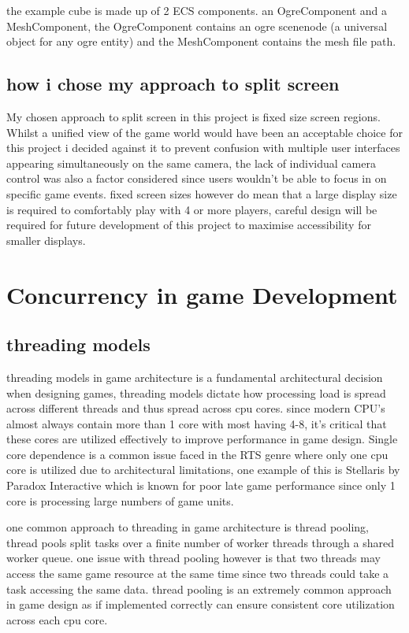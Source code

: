 \documentclass[]{final_report}
\begin{document}
the example cube is made up of 2 ECS components. an OgreComponent and a MeshComponent, the OgreComponent contains an ogre scenenode (a universal object for any ogre entity) and the MeshComponent contains the mesh file path.
\subsection{how i chose my approach to split screen}
My chosen approach to split screen in this project is fixed size screen regions. Whilst a unified view of the game world would have been an acceptable choice for this project i decided against it to prevent confusion with multiple user interfaces appearing simultaneously on the same camera, the lack of individual camera control was also a factor considered since users wouldn't be able to focus in on specific game events. fixed screen sizes however do mean that a large display size is required to comfortably play with 4 or more players, careful design will be required for future development of this project to maximise accessibility for smaller displays.

\section{Concurrency in game Development}
\subsection{threading models}
threading models in game architecture is a fundamental architectural decision when designing games, threading models dictate how processing load is spread across different threads and thus spread across cpu cores. since modern CPU's almost always contain more than 1 core with most having 4-8, it's critical that these cores are utilized effectively to improve performance in game design. Single core dependence is a common issue faced in the RTS genre where only one cpu core is utilized due to architectural limitations, one example of this is Stellaris by Paradox Interactive which is known for poor late game performance since only 1 core is processing large numbers of game units.

one common approach to threading in game architecture is thread pooling, thread pools split tasks over a finite number of worker threads through a shared worker queue. one issue with thread pooling however is that two threads may access the same game resource at the same time since two threads could take a task accessing the same data. thread pooling is an extremely common approach in game design as if implemented correctly can ensure consistent core utilization across each cpu core.
\end{document}
